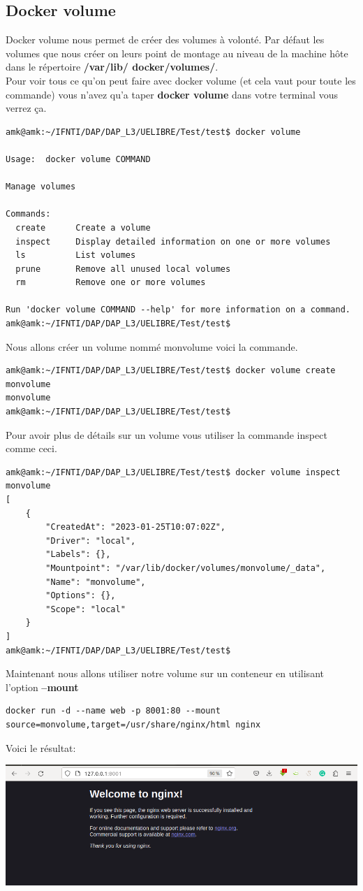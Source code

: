 \documentclass[12pt,a4paper]{article}
\begin{document}
\subsection{Docker volume}
Docker volume nous permet de créer des volumes à volonté. Par
défaut les volumes que nous créer on leurs point de montage au
niveau de la machine hôte dans le répertoire \textbf{/var/lib/
docker/volumes/}.\\
Pour voir tous ce qu'on peut faire avec docker volume (et cela vaut
pour toute les commande) vous n'avez
qu'a taper \textbf{docker volume} dans votre terminal vous verrez
ça.
\begin{verbatim}
amk@amk:~/IFNTI/DAP/DAP_L3/UELIBRE/Test/test$ docker volume 

Usage:  docker volume COMMAND

Manage volumes

Commands:
  create      Create a volume
  inspect     Display detailed information on one or more volumes
  ls          List volumes
  prune       Remove all unused local volumes
  rm          Remove one or more volumes

Run 'docker volume COMMAND --help' for more information on a command.
amk@amk:~/IFNTI/DAP/DAP_L3/UELIBRE/Test/test$ 

\end{verbatim}
Nous allons créer un volume nommé monvolume voici la commande.
\begin{verbatim}
amk@amk:~/IFNTI/DAP/DAP_L3/UELIBRE/Test/test$ docker volume create monvolume
monvolume
amk@amk:~/IFNTI/DAP/DAP_L3/UELIBRE/Test/test$ 
\end{verbatim}
Pour avoir plus de détails sur un volume vous utiliser la commande
inspect comme ceci.
\begin{verbatim}
amk@amk:~/IFNTI/DAP/DAP_L3/UELIBRE/Test/test$ docker volume inspect monvolume 
[
    {
        "CreatedAt": "2023-01-25T10:07:02Z",
        "Driver": "local",
        "Labels": {},
        "Mountpoint": "/var/lib/docker/volumes/monvolume/_data",
        "Name": "monvolume",
        "Options": {},
        "Scope": "local"
    }
]
amk@amk:~/IFNTI/DAP/DAP_L3/UELIBRE/Test/test$ 
\end{verbatim}
Maintenant nous allons utiliser notre volume sur un conteneur en
utilisant l'option \textbf{--mount}
\begin{verbatim}
docker run -d --name web -p 8001:80 --mount 
source=monvolume,target=/usr/share/nginx/html nginx
\end{verbatim}
Voici le résultat:
\begin{center}
\includegraphics[scale=0.3]{img/docker_volume_init.png}
\end{center}
\end{document}
